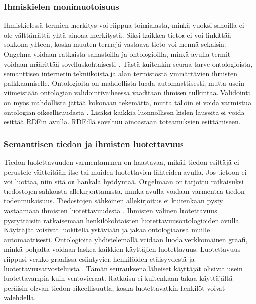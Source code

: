 \documentclass[finnish, 12pt, a4paper, elec, utf8, pdfa, online]{aaltothesis}
\begin{document}
{\subsubsection{Ihmiskielen monimuotoisuus}
Ihmiskielessä termien merkitys voi riippua toimialasta, minkä vuoksi sanoilla ei ole välttämättä yhtä ainoaa merkitystä. Siksi kaikkea tietoa ei voi linkittää sokkona yhteen, koska muuten termejä vastaava tieto voi mennä sekaisin. Ongelma voidaan ratkaista sanastoilla ja ontologioilla, minkä avulla termit voidaan määrittää sovelluskohtaisesti \cite{linked_data_finlad}. Tästä kuitenkin seuraa tarve ontologioista, semanttisen internetin tekniikoista ja alan termistöstä ymmärtävien ihmisten palkkaamiselle. Ontologioita on mahdollista luoda automaattisesti, mutta usein viimeistään ontologian validointivaiheessa vaaditaan ihmisen tulkintaa. Validointi on myös mahdollista jättää kokonaan tekemättä, mutta tällöin ei voida varmistua ontologian oikeellisuudesta \cite{automatic_ontology}. Lisäksi kaikkia luonnollisen kielen lauseita ei voida esittää RDF:n avulla. RDF:llä soveltuu ainoastaan toteamuksien esittämiseen.

\subsubsection{Semanttisen tiedon ja ihmisten luotettavuus}
Tiedon luotettavuuden varmentaminen on haastavaa, mikäli tiedon esittäjä ei perustele väitteitään itse tai muiden luotettavien lähteiden avulla. Jos tietoon ei voi luottaa, niin sitä on hankala hyödyntää. Ongelmaan on tarjottu ratkaisuksi tiedostojen sähköistä allekirjoittamista, minkä avulla voidaan varmentaa tiedon todenmukaisuus. Tiedostojen sähköinen allekirjoitus ei kuitenkaan pysty vastaamaan ihmisten luotettavuudesta \cite{trust}. Ihmisten välinen luotettavuus pystyttäisiin ratkaisemaan henkilökohtaisten luotettavuusontologioiden avulla. Käyttäjät voisivat luokitella ystäviään ja jakaa ontologiaansa muille automaattisesti. Ontologioita yhdistelemällä voidaan luoda verkkomainen graafi, minkä pohjalta voidaan laskea kaikkien käyttäjien luotettavuus.
Luotettavuus riippusi verkko-graafissa esiintyvien henkilöiden etäisyydestä ja luotettavuusarvosteluista \cite{trust}. Tämän seurauksena läheiset käyttäjät olisivat usein luotettavampia kuin ventovieraat. Ratkaisu ei kuitenkaan takaa käyttäjältä peräisin olevan tiedon oikeellisuutta, koska luotettavatkin henkilöt voivat valehdella.

}
\end{document}
